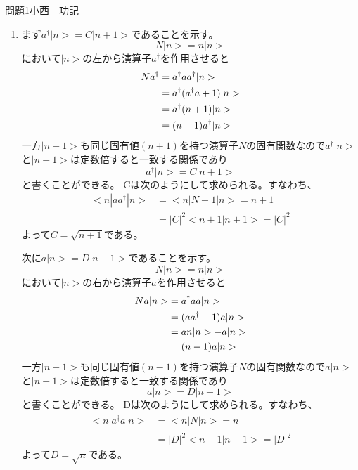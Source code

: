 \documentclass[fleqn]{jbook}
\begin{document}
\begin{answer}{問題1}{小西　功記}
\begin{enumerate}
\item まず$a^{\dag}|n>=C|n+1>$であることを示す。
\begin{equation}
N|n>=n|n>
\end{equation}
において$|n>$の左から演算子$a^{\dag}$を作用させると
\begin{align}
Na^{\dag}&=a^{\dag}aa^{\dag}|n> \notag\\
	&=a^{\dag}(a^{\dag}a+1)|n> \notag\\
	&=a^{\dag}(n+1)|n> \notag\\
	&=(n+1)a^{\dag}|n> 
\end{align}
一方$|n+1>$も同じ固有値$(n+1)$を持つ演算子$N$の固有関数なので$a^{\dag}|n>$と$|n+1>$は定数倍すると一致する関係であり
\begin{equation}
a^{\dag}|n>=C|n+1>
\end{equation}
と書くことができる。
Cは次のようにして求められる。すなわち、
\begin{align}
<n|aa^{\dag}|n>&=<n|N+1|n>=n+1\\
		&=|C|^2<n+1|n+1>=|C|^2
\end{align}
よって$C=\sqrt{n+1}$である。

次に$a|n>=D|n-1>$であることを示す。
\begin{equation}
N|n>=n|n>
\end{equation}
において$|n>$の右から演算子$a$を作用させると
\begin{align}
Na|n>&=a^{\dag}aa|n> \notag\\
	&=(aa^{\dag}-1)a|n> \notag\\
	&=an|n>-a|n> \notag\\
	&=(n-1)a|n>
\end{align}
一方$|n-1>$も同じ固有値$(n-1)$を持つ演算子$N$の固有関数なので$a|n>$と$|n-1>$は定数倍すると一致する関係であり
\begin{equation}
a|n>=D|n-1>
\end{equation}
と書くことができる。
Dは次のようにして求められる。すなわち、
\begin{align}
<n|a^{\dag}a|n>&=<n|N|n>=n\\
		&=|D|^2<n-1|n-1>=|D|^2
\end{align}
よって$D=\sqrt{n}$である。



\end{enumerate}
\end{answer}
\end{document}
